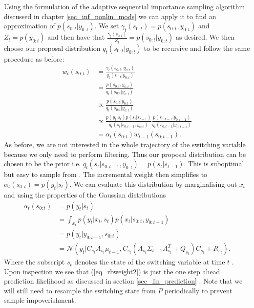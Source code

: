 Using the formulation of the adaptive sequential importance sampling algorithm discussed in chapter \ref{sec_inf_nonlin_mods} we can apply it to find an approximation of $p(s_{0:t}|y_{0:t})$. We set $\gamma_t(s_{0:t})=p(s_{0:t},y_{0:t})$ and $Z_t=p(y_{0:t})$ and then have that $\frac{\gamma_t(s_{0:t})}{Z_t} = p(s_{0:t}|y_{0:t})$ as desired. We then choose our proposal distribution $q_t(s_{0:t}|y_{0:t})$ to be recursive and follow the same procedure as before:
\begin{equation}
\begin{aligned}
w_t(s_{0:t}) &= \frac{\gamma_t(s_{0:t},y_{0:t})}{q_t(s_{0:t}|y_{0:t})} \\
&= \frac{p(s_{0:t},y_{0:t})}{q_t(s_{0:t}|y_{0:t})} \\
&\propto \frac{p(s_{0:t}|y_{0:t})}{q_t(s_{0:t}|y_{0:t})} \\
&\propto \frac{p(y_t|s_t)p(s_t|s_{t-1})}{q_t(s_t|s_{0:t-1},y_{0:t})}\frac{p(s_{0:t-1}|y_{0:t-1})}{q_t(s_{0:t-1}|y_{0:t-1})} \\
&= \alpha_t(s_{0:t})w_{t-1}(s_{0:t-1}).
\end{aligned}
\label{eq_rbweight1}
\end{equation}
As before, we are not interested in the whole trajectory of the switching variable because we only need to perform filtering. Thus our proposal distribution can be chosen to be the prior i.e. $q_t(s_t|s_{0:t-1},y_{0:t}) = p(s_t|s_{t-1})$. This is suboptimal but easy to sample from \cite{doucet}. The incremental weight then simplifies to $\alpha_t(s_{0:t}) = p(y_t|s_t)$. We can evaluate this distribution by marginalising out $x_t$ and using the properties of the Gaussian distributions 
\begin{equation}
\begin{aligned}
\alpha_t(s_{0:t}) &= p(y_t|s_t) \\
&= \int_{x_t} p(y_t|x_t,s_t)p(x_t|s_{0:t},y_{0:t-1}) \\
&= p(y_t|y_{0:t-1}, s_{0:t}) \\
&= \mathcal{N}\left(y_t | C_{s_t}A_{s_t}\mu_{t-1}, C_{s_t}\left(A_{s_t}\Sigma_{t-1}A_{s_t}^T+Q_{s_t} \right)C_{s_t} + R_{s_t} \right).
\end{aligned}
\label{eq_rbweight2}
\end{equation} 
Where the subscript $s_t$ denotes the state of the switching variable at time $t$ \cite{murphy1}. Upon inspection we see that (\ref{eq_rbweight2}) is just the one step ahead prediction likelihood as discussed in section \ref{sec_lin_prediction} \cite{murphy1}. Note that we will still need to resample the switching state from $P$ periodically to prevent sample impoverishment. 

